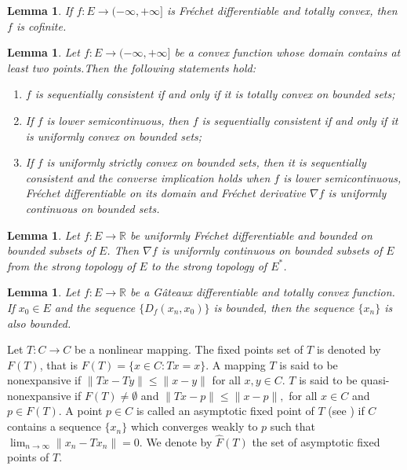 \documentclass[reqno,b5paper]{amsart}
\theoremstyle{plain}
\newtheorem{lemma}[theorem]{Lemma}
\theoremstyle{definition}
\numberwithin{equation}{section}
\numberwithin{equation}{section}
\begin{document}
\begin{lemma}\cite[Proposition 2.3]{rei}
If $f:E\to(-\infty,+\infty]$ is Fr\'{e}chet differentiable and totally convex, then $f$ is cofinite.
\end{lemma}
\begin{lemma}\cite{but}\label{jad}
Let $f:E\to(-\infty,+\infty]$ be a convex function whose domain contains at least two points.Then the following statements hold:
\begin{enumerate}
\item
$f$ is sequentially consistent if and only if it is totally convex on bounded sets;

\item
If $f$ is lower semicontinuous, then $f$ is sequentially consistent if and only if it is uniformly convex on bounded sets;

\item
If $f$ is uniformly strictly convex on bounded sets, then it is sequentially consistent and the converse implication holds when $f$ is lower semicontinuous, Fr\'{e}chet differentiable on its domain and Fr\'{e}chet derivative $\nabla f$ is uniformly continuous on bounded sets.

\end{enumerate}

\end{lemma}
\begin{lemma}\cite[Proposition 2.1]{rei4}\label{lem7}
Let $f:E\to\mathbb{R}$ be uniformly Fr\'{e}chet differentiable and bounded on bounded subsets of $E$. Then $\nabla f$ is uniformly continuous on bounded subsets of $E$ from the strong topology of $E$ to the strong topology of $E^{*}$.
\end{lemma}
\begin{lemma}\cite[Lemma 3.1]{rei}\label{taz}
Let $f:E\to \mathbb{R}$ be a G\^{a}teaux differentiable and totally convex function. If $x_{0}\in E$ and the sequence $\{D_{f}(x_{n},x_{0})\}$ is bounded, then the sequence $\{x_{n}\}$ is also bounded.

\end{lemma}

Let $T:C\to C$ be a nonlinear mapping. The fixed points set of $T$ is denoted by $F(T)$, that is $F(T)=\{x\in C: Tx=x\}$. A mapping $T$ is said to be nonexpansive if $\|Tx-Ty\|\leq \|x-y\|$ for all $x,y\in C$. $T$ is said to be quasi-nonexpansive if $F(T)\neq \emptyset$ and $\|Tx-p\|\leq \|x-p\|,$ for all $x\in C$ and $p\in F(T)$. A point $p\in C$ is called an asymptotic fixed point of $T$ (see \cite{rei2}) if $C$ contains a sequence $\{x_{n}\}$ which converges weakly to $p$ such that $\lim_{n\to\infty}\|x_{n}-Tx_{n}\|=0$. We denote by $\widehat{F}(T)$ the set of asymptotic fixed points of $T$.
\end{document}
